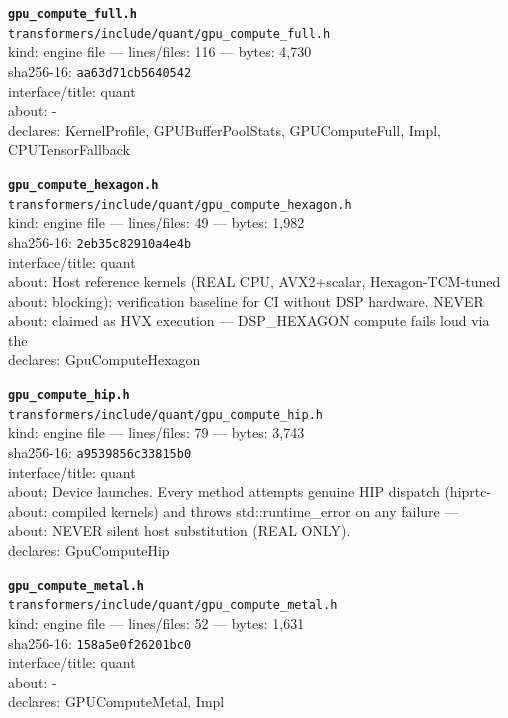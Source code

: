 \noindent\textbf{\texttt{gpu\_compute\_full.h}}\\
\texttt{transformers/include/quant/gpu\_compute\_full.h}\\
kind: engine file --- lines/files: 116 --- bytes: 4,730\\
sha256-16: \texttt{aa63d71cb5640542}\\
interface/title: quant\\
about: -\\
declares: KernelProfile, GPUBufferPoolStats, GPUComputeFull, Impl, CPUTensorFallback\\
\vspace*{6.0pt}

\noindent\textbf{\texttt{gpu\_compute\_hexagon.h}}\\
\texttt{transformers/include/quant/gpu\_compute\_hexagon.h}\\
kind: engine file --- lines/files: 49 --- bytes: 1,982\\
sha256-16: \texttt{2eb35c82910a4e4b}\\
interface/title: quant\\
about: Host reference kernels (REAL CPU, AVX2+scalar, Hexagon-TCM-tuned\\
about: blocking): verification baseline for CI without DSP hardware. NEVER\\
about: claimed as HVX execution — DSP\_HEXAGON compute fails loud via the\\
declares: GpuComputeHexagon\\
\vspace*{6.0pt}

\noindent\textbf{\texttt{gpu\_compute\_hip.h}}\\
\texttt{transformers/include/quant/gpu\_compute\_hip.h}\\
kind: engine file --- lines/files: 79 --- bytes: 3,743\\
sha256-16: \texttt{a9539856c33815b0}\\
interface/title: quant\\
about: Device launches. Every method attempts genuine HIP dispatch (hiprtc-\\
about: compiled kernels) and throws std::runtime\_error on any failure —\\
about: NEVER silent host substitution (REAL ONLY).\\
declares: GpuComputeHip\\
\vspace*{6.0pt}
\newpage

\noindent\textbf{\texttt{gpu\_compute\_metal.h}}\\
\texttt{transformers/include/quant/gpu\_compute\_metal.h}\\
kind: engine file --- lines/files: 52 --- bytes: 1,631\\
sha256-16: \texttt{158a5e0f26201bc0}\\
interface/title: quant\\
about: -\\
declares: GPUComputeMetal, Impl\\
\vspace*{6.0pt}

